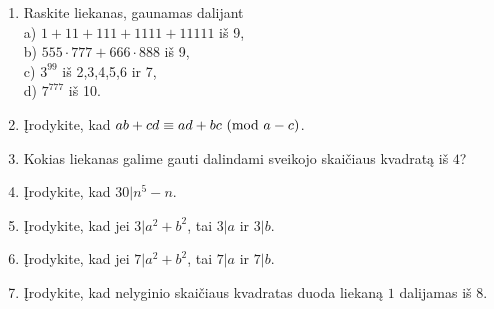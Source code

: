 \begin{enumerate} 
  \item Raskite liekanas, gaunamas dalijant \\ 
    a) $1 + 11 + 111 + 1111 + 11111$ iš 9, \\ 
    b) $555\cdot 777 + 666\cdot 888$ iš 9,\\ 
    c) $3^{99}$ iš 2,3,4,5,6 ir 7,\\ 
    d) $7^{777}$ iš 10. 
  \item Įrodykite, kad $ab+cd \equiv ad + bc \ (\text{mod } a-c)$.
  \item Kokias liekanas galime gauti dalindami sveikojo skaičiaus kvadratą
    iš $4$?  
  \item Įrodykite, kad $30|n^5-n$.  
  \item Įrodykite, kad jei $3|a^2 + b^2$, tai $3|a$ ir $3|b$.  
  \item Įrodykite, kad jei $7|a^2 + b^2$, tai $7|a$ ir $7|b$.  
  \item Įrodykite, kad nelyginio skaičiaus kvadratas duoda liekaną $1$
    dalijamas iš $8$.  

\end{enumerate}
